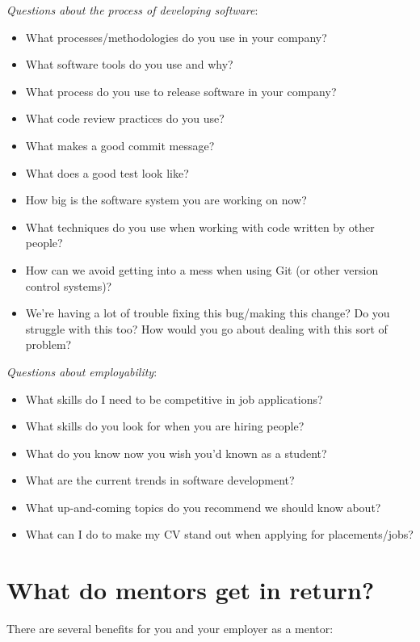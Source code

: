 \documentclass[
]{book}
\providecommand{\tightlist}{%
  \setlength{\itemsep}{0pt}\setlength{\parskip}{0pt}}
\begin{document}
\emph{Questions about the process of developing software}:

\begin{itemize}
\tightlist
\item
  What processes/methodologies do you use in your company?
\item
  What software tools do you use and why?
\item
  What process do you use to release software in your company?
\item
  What code review practices do you use?
\item
  What makes a good commit message?
\item
  What does a good test look like?
\item
  How big is the software system you are working on now?
\item
  What techniques do you use when working with code written by other people?
\item
  How can we avoid getting into a mess when using Git (or other version control systems)?
\item
  We're having a lot of trouble fixing this bug/making this change? Do you struggle with this too? How would you go about dealing with this sort of problem?
\end{itemize}

\emph{Questions about employability}:

\begin{itemize}
\tightlist
\item
  What skills do I need to be competitive in job applications?
\item
  What skills do you look for when you are hiring people?
\item
  What do you know now you wish you'd known as a student?
\item
  What are the current trends in software development?
\item
  What up-and-coming topics do you recommend we should know about?
\item
  What can I do to make my CV stand out when applying for placements/jobs?
\end{itemize}

\hypertarget{payback}{%
\section{What do mentors get in return?}\label{payback}}

There are several benefits for you and your employer as a mentor:
\end{document}
